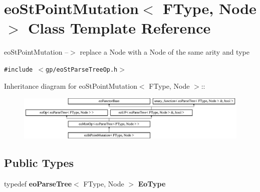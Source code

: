 \section{eo\-St\-Point\-Mutation$<$ FType, Node $>$ Class Template Reference}
\label{classeo_st_point_mutation}
eo\-St\-Point\-Mutation --$>$ replace a Node with a Node of the same arity and type  


{\tt \#include $<$gp/eo\-St\-Parse\-Tree\-Op.h$>$}

Inheritance diagram for eo\-St\-Point\-Mutation$<$ FType, Node $>$::\begin{figure}[H]
\begin{center}
\leavevmode
\includegraphics[height=2.14559cm]{classeo_st_point_mutation}
\end{center}
\end{figure}
\subsection*{Public Types}
\begin{CompactItemize}
\item 
typedef {\bf eo\-Parse\-Tree}$<$ FType, Node $>$ {\bf Eo\-Type}\label{classeo_st_point_mutation_w0}

\end{CompactItemize}
